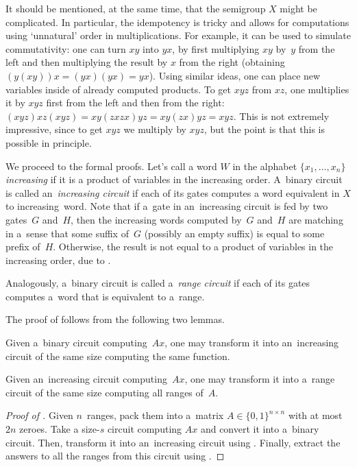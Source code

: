\documentclass{toc}
\begin{document}
It should be mentioned, at the same time, that the semigroup $X$ might be complicated.
In particular, the idempotency is tricky and allows for computations using `unnatural' order in multiplications. For example, it can be used to simulate commutativity: one can turn $xy$ into $yx$, by first multiplying $xy$ by~$y$ from the left and then multiplying the result by $x$ from the right (obtaining $(y(xy))x=(yx)(yx)=yx$). Using similar ideas, one can place new variables inside of already computed products. To get $xyz$ from $xz$, one multiplies it by $xyz$ first from the left and then from the right: $(xyz)xz(xyz)=xy(zxzx)yz=xy(zx)yz=xyz$.
This is not extremely impressive, since to get $xyz$ we multiply by $xyz$, but the point is that this is possible in principle.

We proceed to the formal proofs. Let's call a word $W$ in the alphabet $\{x_1,\ldots,x_n\}$ \emph{increasing} if it is a product of variables in the increasing order. A~binary circuit is called an~\emph{increasing circuit} if each of its gates computes a word equivalent in $X$ to increasing~word.
Note that if a~gate in an~increasing circuit is fed by two gates~$G$ and~$H$, then the increasing words computed by~$G$ and~$H$ are matching in a~sense that some suffix of~$G$ (possibly an empty suffix) is equal to some prefix of~$H$. Otherwise, the result is not equal to a product of variables in the increasing order, due to .

Analogously, a~binary circuit is called a~\emph{range circuit} if each of its gates computes a~word that is equivalent to a~range.

The proof of  follows from the following two lemmas.

\begin{lemma}\label{lemma:correctorder}
    Given a~binary circuit computing~$Ax$, one may transform it into an~increasing circuit of the same size computing the same function.
\end{lemma}

\begin{lemma}\label{lemma:matrixranges}
    Given an~increasing circuit computing~$Ax$, one may transform it into a~range circuit of the same size computing all ranges of~$A$.
\end{lemma}

\begin{proof}[Proof of {}]
    Given $n$~ranges, pack them into a~matrix $A \in \{0,1\}^{n \times n}$ with at most $2n$ zeroes. Take a size-$s$ circuit computing $Ax$ and convert it into a~binary circuit. Then, transform it into an~increasing circuit using . Finally, extract the answers to all the ranges from this circuit using .
\end{proof}
\end{document}
